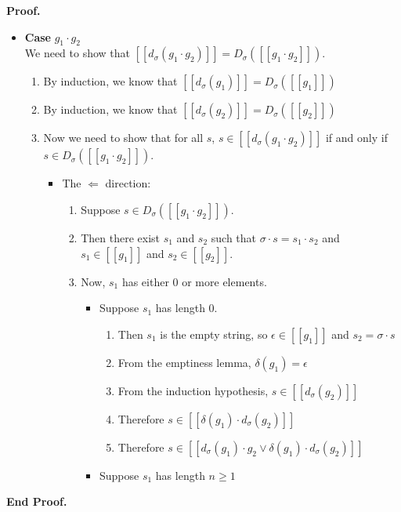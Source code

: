 \documentclass{article}
\newcommand{\interp}[1]{[\![{#1}]\!]}
\newcommand{\semderiv}[2]{D_{#1}({#2})}
\newcommand{\deriv}[2]{d_{#1}({#2})}
\newcommand{\emptify}[1]{\delta({#1})}
\newenvironment{proof}{\noindent\textbf{Proof.}}
{\noindent\textbf{End Proof.}}
\newenvironment{caseblock}{\begin{itemize}}{\end{itemize}}
\newenvironment{case}[1]{\item \textbf{Case} {#1}\\}{}
\begin{document}
\begin{proof}
\begin{caseblock}
    \begin{case}{$g_1\cdot g_2$}
      We need to show that $\interp{\deriv{\sigma}{g_1\cdot g_2}} = \semderiv{\sigma}{\interp{g_1\cdot g_2}}$. 
      \begin{enumerate}
        \item By induction, we know that $\interp{\deriv{\sigma}{g_1}} = \semderiv{\sigma}{\interp{g_1}}$
        \item By induction, we know that $\interp{\deriv{\sigma}{g_2}} = \semderiv{\sigma}{\interp{g_2}}$
        \item Now we need to show that for all $s$, $s \in \interp{\deriv{\sigma}{g_1\cdot g_2}}$ if and 
          only if $s \in \semderiv{\sigma}{\interp{g_1\cdot g_2}}$. 
          \begin{itemize}
          \item The $\Leftarrow$ direction: 
            \begin{enumerate}
              \item Suppose $s \in \semderiv{\sigma}{\interp{g_1\cdot g_2}}$. 
              \item Then there exist $s_1$ and $s_2$ such that $\sigma\cdot s = s_1\cdot s_2$ and 
                $s_1 \in \interp{g_1}$ and $s_2 \in \interp{g_2}$. 
              \item Now, $s_1$ has either 0 or more elements. 
                \begin{itemize}
                  \item Suppose $s_1$ has length $0$. 
                    \begin{enumerate}
                      \item Then $s_1$ is the empty string, so $\epsilon \in \interp{g_1}$ and 
                            $s_2 = \sigma \cdot s$
                      \item From the emptiness lemma,  $\emptify{g_1} = \epsilon$ 
                      \item From the induction hypothesis, $s \in \interp{\deriv{\sigma}{g_2}}$ 
                      \item Therefore $s \in \interp{\emptify{g_1}\cdot\deriv{\sigma}{g_2}}$
                      \item Therefore $s \in \interp{\deriv{\sigma}{g_1}\cdot g_2 \vee \emptify{g_1}\cdot\deriv{\sigma}{g_2}}$
                  \end{enumerate}
                 \item Suppose $s_1$ has length $n \geq 1$ 
                   \begin{enumerate}

\end{enumerate}
\end{itemize}
\end{enumerate}
\end{itemize}
\end{enumerate}
\end{case}
\end{caseblock}
\end{proof}
\end{document}
